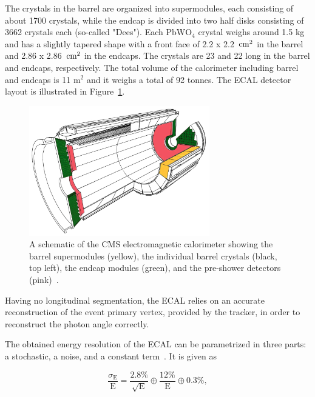 The  crystals in the barrel are organized into supermodules, each consisting of about 1700 crystals, while the endcap is divided into two half disks consisting of 3662 crystals each (so-called "Dees").
Each $\textrm{PbWO}_4$ crystal weighs around 1.5 kg and has a slightly tapered shape with a front face of 2.2 x 2.2 $\,\text{cm}^2$ in the barrel and 2.86 x 2.86 $\,\text{cm}^2$ in the endcaps. The crystals are 23 and 22 \cm long in the barrel and endcaps, respectively. The total volume of the calorimeter including barrel and endcaps is 11 $\textrm{m}^2$ and it weighs a total of 92 tonnes.
The ECAL detector layout is illustrated in Figure~\ref{fig:cms:ecal}.
\begin{figure}[h] 
    \centering
    \includegraphics[width=0.7\textwidth]{figures/cms/ecal.jpg}
    \caption{A schematic of the CMS electromagnetic calorimeter showing the barrel supermodules (yellow), the individual barrel crystals (black, top left), the endcap modules (green), and the pre-shower detectors (pink)~\cite{Chatrchyan:2008aa}.}
    \label{fig:cms:ecal}
\end{figure}

Having no longitudinal segmentation, the ECAL relies on an accurate reconstruction of the event primary vertex, provided by the tracker, in order to reconstruct the photon angle correctly.

The obtained energy resolution of the ECAL can be parametrized in three parts: a stochastic, a noise, and a constant term~\cite{Adzic:2007mi}. It is given as

\begin{equation*}
  \frac{\sigma_{\textrm{E}}}{\textrm{E}} = \frac{2.8 \%}{\sqrt{\textrm{E}}}\oplus\frac{12 \%}{\textrm{E}}\oplus 0.3 \%,
\end{equation*}

